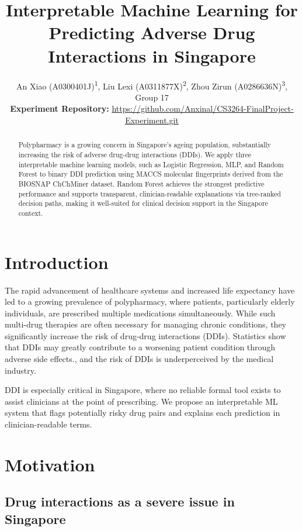 \documentclass[letterpaper]{article} %
\title{Interpretable Machine Learning for Predicting Adverse Drug Interactions in Singapore}
\author{
    An Xiao (A0300401J)\textsuperscript{\rm 1},
    Liu Lexi (A0311877X)\textsuperscript{\rm 2},
    Zhou Zirun (A0286636N)\textsuperscript{\rm 3},
    Group 17\\
    \textbf{Experiment Repository:} \url{https://github.com/Anxinal/CS3264-FinalProject-Experiment.git}
}
\begin{document}
\maketitle



\begin{abstract}
Polypharmacy is a growing concern in Singapore's ageing population, substantially increasing the risk of adverse drug-drug interactions (DDIs). We apply three interpretable machine learning models, such as Logistic Regression, MLP, and Random Forest to binary DDI prediction using MACCS molecular fingerprints derived from the BIOSNAP ChChMiner dataset. Random Forest achieves the strongest predictive performance and supports transparent, clinician-readable explanations via tree-ranked decision paths, making it well-suited for clinical decision support in the Singapore context.
\end{abstract}

\section{Introduction}

The rapid advancement of healthcare systems and increased life expectancy have led to a growing prevalence of polypharmacy, where patients, particularly elderly individuals, are prescribed multiple medications simultaneously. While such multi-drug therapies are often necessary for managing chronic conditions, they significantly increase the risk of drug-drug interactions (DDIs). Statistics show that DDIs may greatly contribute to a worsening patient condition through adverse side effects.\cite{Chan2016:chan}, and the risk of DDIs is underperceived by the medical industry.\cite{polypharmacy}

DDI is especially critical in Singapore,\cite{Ho2023} where no reliable formal tool exists to assist clinicians at the point of prescribing. We propose an interpretable ML system that flags potentially risky drug pairs and explains each prediction in clinician-readable terms.


\section{Motivation}

\subsection{Drug interactions as a severe issue in Singapore}
\end{document}
